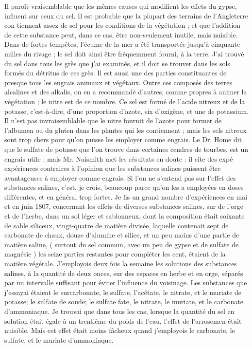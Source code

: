 Il paroît vraisemblable que les mêmes causes qui modifient les effets du gypse, influent sur ceux du sel. Il est probable que la plupart des terrains de l'Angleterre con\setcounter{page}{244} tiennent assez de sel pour les conditions de la végétation ; et que l'addition de cette substance peut, dans ce cas, être non-seulement inutile, mais nuisible. Dans de fortes tempêtes, l'écume de la mer a été transportée jusqu'à cinquante milles du rivage ; le sel doit ainsi être fréquemment fourni, à la terre. J'ai trouvé du sel dans tous les grès que j'ai examinés, et il doit se trouver dans les sols formés du détritus de ces grès. Il est aussi une des parties constituantes de presque tous les engrais animaux et végétaux.
Outre ces composés des terres alcalines et des alkalis, on en a recommandé d'autres, comme propres à animer la végétation ; le nitre est de ce nombre. Ce sel est formé de l'acide nitreux et de la potasse, c'est-à-dire, d'une proportion d'azote, six d'oxigène, et une de potassium. Il n'est pas invraisemblable que le nitre fournit de l'azote pour former de l'albumen ou du gluten dans les plantes qui les contiennent ; mais les sels nitreux sont trop chers pour qu'on puisse les employer comme engrais.
Le Dr. Home dit que le sulfate de potasse que l'on trouve dans certaines cendres de tourbes, est un engrais utile ; mais Mr. Naismith met les résultats en doute : il cite des expé\setcounter{page}{245} expériences contraires à l’opinion que les substances salines puissent être avantageuses à employer comme engrais.
Si l’on ne s’entend pas sur l’effet des substances salines, c’est, je crois, beaucoup parce qu’on les a employées en doses différentes, et en général trop fortes.
Je fis un grand nombre d’expériences en mai et en juin 1807, concernant les effets de diverses substances salines, sur de l’orge et de l’herbe, dans un sol léger et sablonneux, dont la composition était soixante de sable siliceux, vingt-quatre de matière divisée, laquelle contenait sept de carbonate de chaux, douze d’alumine et silice, et un peu moins d’une partie de matière saline, ( surtout du sel commun, avec un peu de gypse et de sulfate de magnésie ) les seize parties restantes pour compléter les cent, étaient de la matière végétale.
J’employois deux fois la semaine les solutions des substances salines, à la quantité de deux onces, sur des espaces en herbe et en orge, séparés par un intervalle suffisant pour éviter l’influence du voisinage. Les substances que j’essayai étaient le surcarbonate, le sulfate, l’acétate, le nitrate, et le muriate de potasse; le sulfate de soude; le sulfate\setcounter{page}{246} fate, le nitrate, le muriate, et le carbonate d'ammoniaque. Je trouvai que dans tous les cas, lorsque la quantité du sel en solution était égale à un trentième du poids de l'eau, l'effet de l'arrosemen était nuisible. Mais cet effet était moins fâcheux quand j'employois le carbonate, le sulfate, et le muriate d'ammoniaque.
